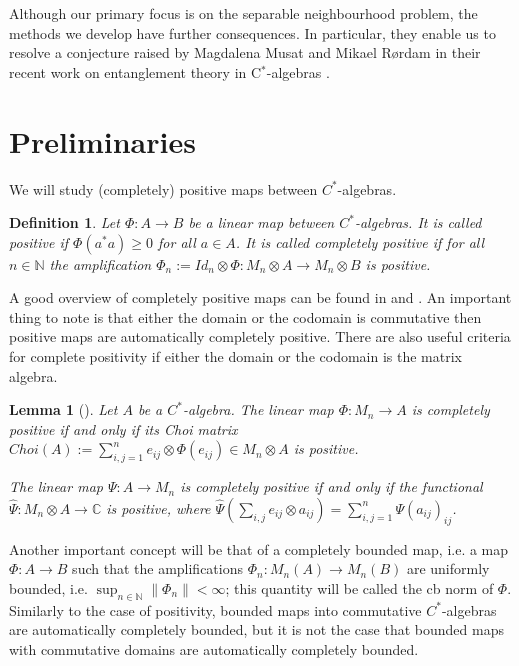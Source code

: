 \documentclass[11pt]{article}
\numberwithin{theorem}{section}
\newtheorem{definition}[theorem]{Definition}
\newtheorem{lemma}[theorem]{Lemma}
\begin{document}
Although our primary focus is on the separable neighbourhood problem, the methods we develop have further consequences. In particular, they enable us to resolve a conjecture raised by Magdalena Musat and Mikael R\o{}rdam in their recent work on entanglement theory in C$^*$-algebras \cite{MusatRordam}.





\section{Preliminaries}
We will study (completely) positive maps between $C^{\ast}$-algebras.
\begin{definition}
Let $\Phi: A \to B$ be a linear map between $C^{\ast}$-algebras. It is called positive if $\Phi(a^{\ast}a)\geqslant 0$ for all $a\in A$. It is called completely positive if for all $n \in \mathbb{N}$ the amplification $\Phi_n:= Id_n \otimes \Phi: M_n \otimes A \to M_n \otimes B$ is positive.   
\end{definition}
A good overview of completely positive maps can be found in \cite{paulsen-book} and \cite{BrownOzawa}. An important thing to note is that either the domain or the codomain is commutative then positive maps are automatically completely positive. There are also useful criteria for complete positivity if either the domain or the codomain is the matrix algebra.
\begin{lemma}[{\cite[Chapter 1: Proposition 5.11, Proposition 5.13]{BrownOzawa}}]\label{lem:Choimatrix}
Let $A$ be a $C^{\ast}$-algebra. The linear map $\Phi: M_n \to A$ is completely positive if and only if its \emph{Choi matrix} $Choi(A):= \sum_{i,j=1}^{n} e_{ij} \otimes \Phi(e_{ij}) \in M_{n} \otimes A$ is positive.

The linear map $\Psi: A \to M_n$ is completely positive if and only if the functional $\widehat{\Psi}: M_n\otimes A \to \mathbb{C}$ is positive, where $\widehat{\Psi}(\sum_{i,j} e_{ij}\otimes a_{ij}) = \sum_{i,j=1}^{n} \Psi(a_{ij})_{ij}$.
\end{lemma}

Another important concept will be that of a completely bounded map, i.e. a map $\Phi: A \to B$ such that the amplifications $\Phi_n: M_n(A) \to M_n(B)$ are uniformly bounded, i.e. $\sup_{n\in\mathbb{N}} \|\Phi_n\| < \infty$; this quantity will be called the cb norm of $\Phi$. Similarly to the case of positivity, bounded maps into commutative $C^{\ast}$-algebras are automatically completely bounded, but it is not the case that bounded maps with commutative domains are automatically completely bounded.
\end{document}

